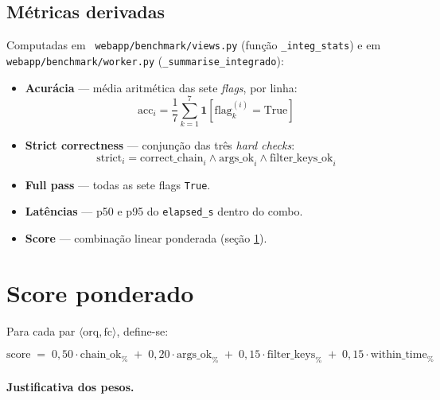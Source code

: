 \documentclass[11pt,a4paper]{article}
\newcommand{\code}[1]{\texttt{\small #1}}
\newcommand{\file}[1]{\texttt{\small\color{black!75} #1}}
\begin{document}
\subsection{Métricas derivadas}

Computadas em \file{webapp/benchmark/views.py} (função
\code{\_integ\_stats}) e em \file{webapp/benchmark/worker.py}
(\code{\_summarise\_integrado}):

\begin{itemize}[leftmargin=*]
\item \textbf{Acurácia} --- média aritmética das sete \emph{flags}, por
linha:
\begin{equation}
\text{acc}_i = \frac{1}{7} \sum_{k=1}^{7} \mathbf{1}[\text{flag}_k^{(i)} = \text{True}]
\end{equation}

\item \textbf{Strict correctness} --- conjunção das três \emph{hard
checks}:
\begin{equation}
\text{strict}_i = \text{correct\_chain}_i \wedge \text{args\_ok}_i \wedge \text{filter\_keys\_ok}_i
\end{equation}

\item \textbf{Full pass} --- todas as sete flags \texttt{True}.

\item \textbf{Latências} --- p50 e p95 do \code{elapsed\_s} dentro do
combo.

\item \textbf{Score} --- combinação linear ponderada (seção \ref{sec:score}).
\end{itemize}

\section{Score ponderado}
\label{sec:score}

Para cada par $\langle \text{orq}, \text{fc} \rangle$, define-se:

\begin{equation}
\boxed{
\text{score} \;=\; 0{,}50 \cdot \text{chain\_ok}_\% \;+\; 0{,}20 \cdot \text{args\_ok}_\%
              \;+\; 0{,}15 \cdot \text{filter\_keys}_\% \;+\; 0{,}15 \cdot \text{within\_time}_\%
}
\label{eq:score}
\end{equation}

\paragraph{Justificativa dos pesos.}
\end{document}
